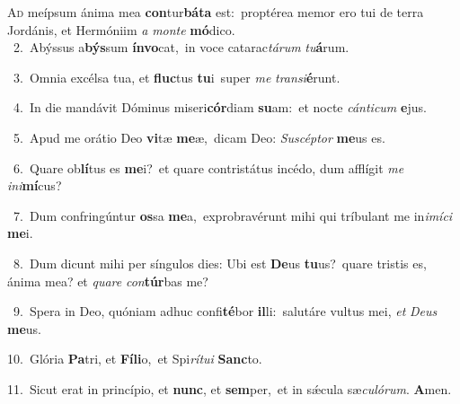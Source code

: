 \lettrine{\initial\textcolor{\initialcolor}{A}}{d} meípsum ánima mea \textbf{con}\-tur\-\textbf{bá}\-\textbf{ta} est:~\star proptérea memor ero tui de terra Jordánis, et Hermóniim \textit{a} \textit{mon}\-\textit{te} \textbf{mó}\-dico.\\
{\numbfont\textcolor{\numbcolor}{~2.}}~Abýssus a\-\textbf{býs}\-sum \textbf{ín}\-\textbf{vo}cat,~\star in voce catarac\-\textit{tá}\-\textit{rum} \textit{tu}\-\textbf{á}rum.\par
{\numbfont\textcolor{\numbcolor}{~3.}}~Omnia excélsa tua, et \textbf{fluc}\-tus \textbf{tu}\-i~\star super \textit{me} \textit{trans}\-\textit{i}\textbf{é}runt.\par
{\numbfont\textcolor{\numbcolor}{~4.}}~In die mandávit Dóminus miseri\-\textbf{cór}\-diam \textbf{su}\-am:~\star et nocte \textit{cán}\-\textit{ti}\textit{cum} \textbf{e}\-jus.\par
{\numbfont\textcolor{\numbcolor}{~5.}}~Apud me orátio Deo \textbf{vi}\-tæ \textbf{me}\-æ,~\star dicam Deo: \textit{Su}\-\textit{scép}\textit{tor} \textbf{me}\-us es.\par
{\numbfont\textcolor{\numbcolor}{~6.}}~Quare ob\-\textbf{lí}\-tus es \textbf{me}\-i?~\star et quare contristátus incédo, dum afflígit \textit{me} \textit{in}\-\textit{i}\textbf{mí}cus?\par
{\numbfont\textcolor{\numbcolor}{~7.}}~Dum confringúntur \textbf{os}\-sa \textbf{me}\-a,~\star exprobravérunt mihi qui tríbulant me in\-\textit{i}\-\textit{mí}\textit{ci} \textbf{me}\-i.\par
{\numbfont\textcolor{\numbcolor}{~8.}}~Dum dicunt mihi per síngulos dies: Ubi est \textbf{De}\-us \textbf{tu}\-us?~\star quare tristis es, ánima mea? et \textit{qua}\-\textit{re} \textit{con}\-\textbf{túr}bas me?\par
{\numbfont\textcolor{\numbcolor}{~9.}}~Spera in Deo, quóniam adhuc confi\-\textbf{té}\-bor \textbf{il}\-li:~\star salutáre vultus mei, \textit{et} \textit{De}\-\textit{us} \textbf{me}\-us.\par
{\numbfont\textcolor{\numbcolor}{10.}}~Glória \textbf{Pa}\-tri, et \textbf{Fí}\-\textbf{li}o,~\star et Spi\-\textit{rí}\-\textit{tu}\textit{i} \textbf{Sanc}\-to.\par
{\numbfont\textcolor{\numbcolor}{11.}}~Sicut erat in princípio, et \textbf{nunc}\-, et \textbf{sem}\-per,~\star et in sǽcula sæ\-\textit{cu}\-\textit{ló}\textit{rum}. \textbf{A}\-men.\par

